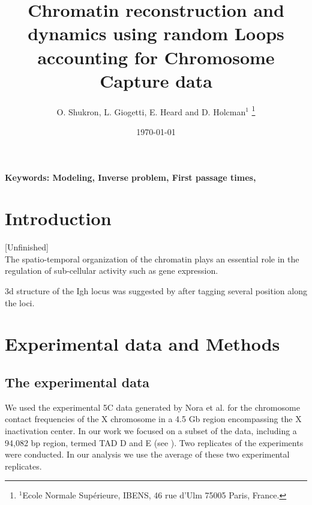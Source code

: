 \documentclass[12pt]{article}
\begin{document}
\title{Chromatin reconstruction and dynamics using random Loops accounting for Chromosome Capture data}
\author{O. Shukron,  L. Giogetti, E. Heard and D. Holcman$^{1}$ \footnote{ $^1$Ecole Normale Sup\'erieure, IBENS, 46 rue d'Ulm 75005 Paris, France.}}
\date{\today}
\maketitle
\begin{abstract}\label{abstract}
\end{abstract}
{\bf \noindent Keywords: Modeling, Inverse problem, First passage times,}\\

\section{Introduction}\label{section_introduction}
[Unfinished]\\
The spatio-temporal organization of the chromatin plays an essential role in the regulation of sub-cellular activity such as gene expression\cite{cremer2001chromosome}.




3d structure of the Igh locus was suggested by \cite{jhunjhunwala20083d} after tagging several position along the loci.


\section{Experimental data and Methods}\label{section_experimentalDataAndMethods}

\subsection{The experimental data}\label{subsection_theExperimentalData}
We used the experimental 5C data generated by Nora et al.\cite{Nora2012} for the chromosome contact frequencies of the X chromosome in a 4.5 Gb region encompassing the X inactivation center. In our work we focused on a subset of the data, including a 94,082 bp region, termed TAD D and E (see \cite{Nora2012}).
Two replicates of the experiments were conducted. In our analysis we use the average of these two experimental replicates.
\end{document}
